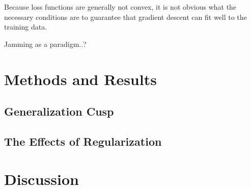 \documentclass[a4paper, 12pt]{article}
\begin{document}
Because loss functions are generally not convex, it is not obvious what the necessary conditions are to guarantee that gradient descent can fit well to the training data. 


Jamming as a paradigm..?

\section{Methods and Results}

\subsection{Generalization Cusp}
\subsection{The Effects of Regularization}

\section{Discussion}

\printbibliography
\end{document}
